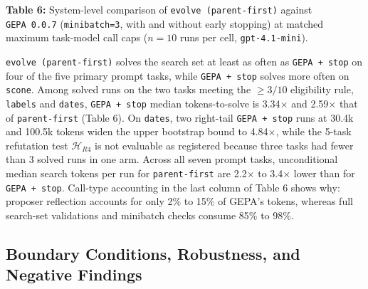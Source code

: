 \documentclass[10pt]{article}
\begin{document}
\textbf{Table 6:} System-level comparison of
\texttt{evolve\ (parent-first)} against \texttt{GEPA\ 0.0.7}
(\texttt{minibatch=3}, with and without early stopping) at matched
maximum task-model call caps (\(n=10\) runs per cell,
\texttt{gpt-4.1-mini}).

\texttt{evolve\ (parent-first)} solves the search set at least as often
as \texttt{GEPA\ +\ stop} on four of the five primary prompt tasks,
while \texttt{GEPA\ +\ stop} solves more often on \texttt{scone}. Among
solved runs on the two tasks meeting the \(\ge 3/10\) eligibility rule,
\texttt{labels} and \texttt{dates}, \texttt{GEPA\ +\ stop} median
tokens-to-solve is 3.34\(\times\) and 2.59\(\times\) that of
\texttt{parent-first} (Table 6). On \texttt{dates}, two right-tail
\texttt{GEPA\ +\ stop} runs at 30.4k and 100.5k tokens widen the upper
bootstrap bound to 4.84\(\times\), while the 5-task refutation test
\(\mathcal{H}_{R4}\) is not evaluable as registered because three tasks
had fewer than 3 solved runs in one arm. Across all seven prompt tasks,
unconditional median search tokens per run for \texttt{parent-first} are
2.2\(\times\) to 3.4\(\times\) lower than for \texttt{GEPA\ +\ stop}.
Call-type accounting in the last column of Table 6 shows why: proposer
reflection accounts for only 2\% to 15\% of GEPA's tokens, whereas full
search-set validations and minibatch checks consume 85\% to 98\%.

\hypertarget{boundary-conditions-robustness-and-negative-findings}{%
\subsection{Boundary Conditions, Robustness, and Negative
Findings}\label{boundary-conditions-robustness-and-negative-findings}}
\end{document}
